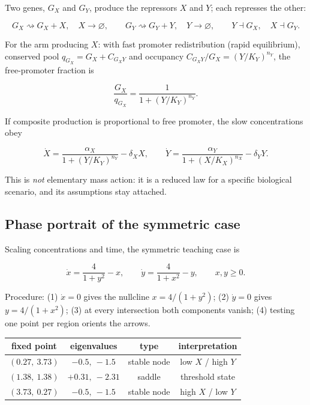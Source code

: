 \documentclass[12pt]{article}
\begin{document}
Two genes, $G_X$ and $G_Y$, produce the repressors $X$ and $Y$; each represses the
other:

\begin{equation}
G_X \rightsquigarrow G_X + X, \quad X \to \varnothing,
\qquad
G_Y \rightsquigarrow G_Y + Y, \quad Y \to \varnothing,
\qquad
Y \dashv G_X, \quad X \dashv G_Y.
\label{eq:togglenet}
\end{equation}

For the arm producing $X$: with fast promoter redistribution (rapid equilibrium),
conserved pool $q_{G_X} = G_X + C_{G_XY}$ and occupancy
$C_{G_XY}/G_X = (Y/K_Y)^{n_Y}$, the free-promoter fraction is

\begin{equation}
\frac{G_X}{q_{G_X}} = \frac{1}{1+(Y/K_Y)^{n_Y}}.
\label{eq:occupancy}
\end{equation}

If composite production is proportional to free promoter, the slow concentrations obey

\begin{equation}
\dot{X} = \frac{\alpha_X}{1+(Y/K_Y)^{n_Y}} - \delta_X X,
\qquad
\dot{Y} = \frac{\alpha_Y}{1+(X/K_X)^{n_X}} - \delta_Y Y.
\label{eq:toggle}
\end{equation}

This is \emph{not} elementary mass action: it is a reduced law for a specific
biological scenario, and its assumptions stay attached.

\subsection{Phase portrait of the symmetric case}

Scaling concentrations and time, the symmetric teaching case is

\begin{equation}
\dot{x} = \frac{4}{1+y^{2}} - x,
\qquad
\dot{y} = \frac{4}{1+x^{2}} - y,
\qquad x,y \geq 0.
\label{eq:togglesym}
\end{equation}

Procedure: (1) $\dot{x}=0$ gives the nullcline $x = 4/(1+y^2)$; (2) $\dot{y}=0$ gives
$y = 4/(1+x^2)$; (3) at every intersection both components vanish; (4) testing one
point per region orients the arrows.

\begin{center}
\begin{tabular}{cccc}
\hline
fixed point & eigenvalues & type & interpretation \\
\hline
$(0.27,\ 3.73)$ & $-0.5,\ -1.5$ & stable node & low $X$ / high $Y$ \\
$(1.38,\ 1.38)$ & $+0.31,\ -2.31$ & saddle & threshold state \\
$(3.73,\ 0.27)$ & $-0.5,\ -1.5$ & stable node & high $X$ / low $Y$ \\
\hline
\end{tabular}
\end{center}
\end{document}
